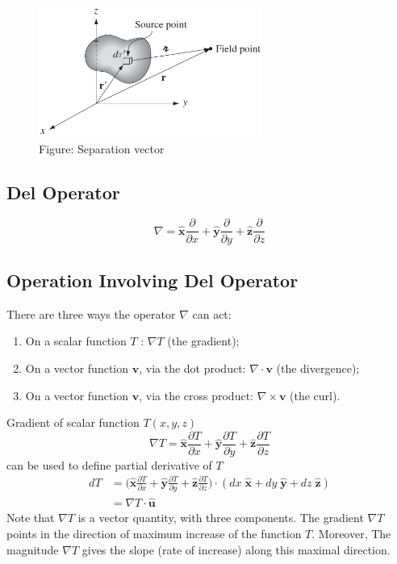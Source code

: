 \documentclass[../main.tex]{subfiles}
\begin{document}
\begin{figure}[b]
    \centering
    \includegraphics[width=0.65\textwidth]{SepVec.png}
    \caption*{Figure: Separation vector}
\end{figure}

\subsection*{Del Operator}
\begin{equation*}
    \nabla = \mathbf{\hat{x}}\frac{\partial}{\partial x}+\mathbf{\hat{y}}\frac{\partial}{\partial y}+\mathbf{\hat{z}}\frac{\partial}{\partial z}
\end{equation*}

\subsection*{Operation Involving Del Operator}
There are three ways the operator $\nabla$ can act:
\begin{enumerate}
    \item On a scalar function $T$ : $\nabla T$ (the gradient); 
    \item On a vector function $\mathbf{v}$, via the dot product: $\nabla \cdot \mathbf{v}$ (the divergence); 
    \item On a vector function $\mathbf{v}$, via the cross product: $\nabla \times \mathbf{v}$ (the curl).
\end{enumerate}

Gradient of scalar function $T(x,y,z)$  
\begin{equation*}
    \nabla T = \mathbf{\hat{x}}\frac{\partial T}{\partial x}+\mathbf{\hat{y}}\frac{\partial T}{\partial y}+\mathbf{\hat{z}}\frac{\partial T}{\partial z}
\end{equation*}
can be used to define partial derivative of $T$ 
\begin{align*}
    dT&= \bigg(  \mathbf{\hat{x}}\frac{\partial T}{\partial x}+ \mathbf{\hat{y}}\frac{\partial T}{\partial y}+ \mathbf{\hat{z}}\frac{\partial T}{\partial z} \bigg)\cdot (dx\;  \mathbf{\hat{x}}+dy\; \mathbf{\hat{y}}+dz\; \mathbf{\hat{z}})\\
    &=\nabla T \cdot \mathbf{\hat{u}}
\end{align*}
Note that $\nabla T$ is a vector quantity, with three components. The gradient $\nabla T$ points in the direction of maximum increase of the function $T$. Moreover, The magnitude $\nabla T$ gives the slope (rate of increase) along this maximal direction.
\end{document}
